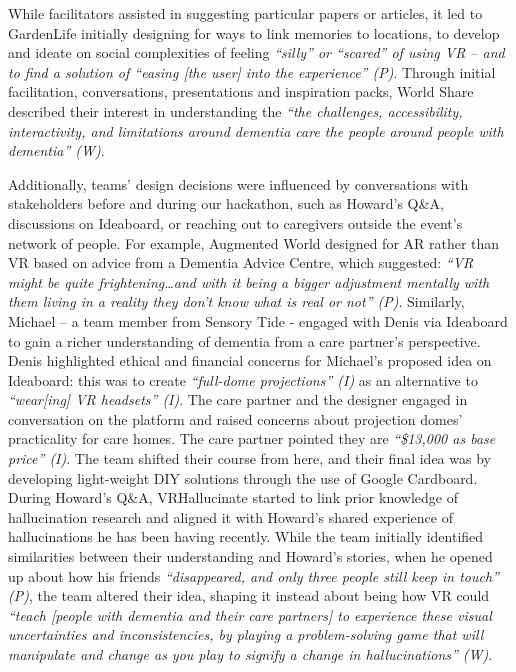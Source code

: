 While facilitators assisted in suggesting particular papers or articles, it led to GardenLife initially designing for ways to link memories to locations, to develop and ideate on social complexities of feeling \textit{“silly” or “scared” of using VR – and to find a solution of “easing [the user] into the experience” (P)}. Through initial facilitation, conversations, presentations and inspiration packs, World Share described their interest in understanding the\textit{ “the challenges, accessibility, interactivity, and limitations around dementia care the people around people with dementia” (W)}.

Additionally, teams’ design decisions were influenced by conversations with stakeholders before and during our hackathon, such as Howard’s Q\&A, discussions on Ideaboard, or reaching out to caregivers outside the event’s network of people. For example, Augmented World designed for AR rather than VR based on advice from a Dementia Advice Centre, which suggested: \textit{“VR might be quite frightening…and with it being a bigger adjustment mentally with them living in a reality they don’t know what is real or not” (P)}. Similarly, Michael – a team member from Sensory Tide - engaged with Denis via Ideaboard to gain a richer understanding of dementia from a care partner’s perspective. Denis highlighted ethical and financial concerns for Michael’s proposed idea on Ideaboard: this was to create\textit{ “full-dome projections” (I)} as an alternative to \textit{“wear[ing] VR headsets” (I)}. The care partner and the designer engaged in conversation on the platform and raised concerns about projection domes’ practicality for care homes. The care partner pointed they are \textit{“\$13,000 as base price” (I)}. The team shifted their course from here, and their final idea was by developing light-weight DIY solutions through the use of Google Cardboard. During Howard’s Q\&A, VRHallucinate started to link prior knowledge of hallucination research and aligned it with Howard’s shared experience of hallucinations he has been having recently. While the team initially identified similarities between their understanding and Howard’s stories, when he opened up about how his friends\textit{ “disappeared, and only three people still keep in touch” (P)}, the team altered their idea, shaping it instead about being how VR could \textit{“teach [people with dementia and their care partners] to experience these visual uncertainties and inconsistencies, by playing a problem-solving game that will manipulate and change as you play to signify a change in hallucinations” (W)}. 

